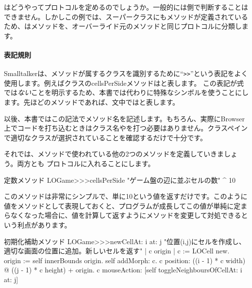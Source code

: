\documentclass[a4paper,10pt,twoside]{book}
\begin{document}

\pharo はどうやってプロトコルを定めるのでしょうか。一般的には\pharo 側で判断することはできません。しかしこの例では、スーパークラスにもメソッドが定義されているため、\pharo はメソッドを、オーバーライド元のメソッドと同じプロトコルに分類します。



\paragraph{表記規則} Smalltalkerは、メソッドが属するクラスを識別するために``\verb|>>|''という表記をよく使用します。例えばクラスのcellsPerSideメソッドはと表します。
この表記が\st 式では\emph{ない}ことを明示するため、本書では代わりに特殊なシンボル\ct{>>>}を使うことにします。先ほどのメソッドであれば、文中ではと表します。


以後、本書ではこの記法でメソッド名を記述します。もちろん、実際にBrowser上でコードを打ち込むときはクラス名や\ct{>>>}を打つ必要はありません。クラスペインで適切なクラスが選択されていることを確認するだけで十分です。

それでは、メソッドで使われている他の2つのメソッドを定義していきましょう。両方とも プロトコルに入れることにします。

\begin{method}[sbegamecellsperside]{定数メソッド}
LOGame>>>cellsPerSide
   "ゲーム盤の辺に並ぶセルの数"
   ^ 10
\end{method}

このメソッドは非常にシンプルで、単に10という値を返すだけです。このように値をメソッドとして表現しておくと、プログラムが成長してこの値が単純に定まらなくなった場合に、値を計算して返すようにメソッドを変更して対処できるという利点があります。

\begin{method}[newCellAt:at:]{初期化補助メソッド}
LOGame>>>newCellAt: i at: j
   "位置(i,j)にセルを作成し、適切な画面の位置に追加。新しいセルを返す"
   | c origin |
   c := LOCell new.
   origin := self innerBounds origin.
   self addMorph: c.
   c position: ((i - 1) * c width) @ ((j - 1) * c height) + origin.
   c mouseAction: [self toggleNeighboursOfCellAt: i at: j]
\end{method}
\end{document}
